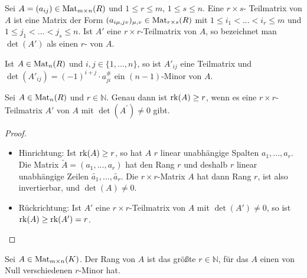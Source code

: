 \begin{definition}[Minor]
	Sei $A=(a_{ij})\in \operatorname{Mat}_{m\times n}(R)$ und $1\le r \le m$, $1\le s \le n$. Eine $r\times s$-
	Teilmatrix von $A$ ist eine Matrix der Form $(a_{i\mu,jv})_{\mu,v}\in \operatorname{Mat}_{r\times s}(R)$ mit $1\le i_1<...<i_r\le m$ 
	und $1\le j_1<...<j_s\le n$. Ist $A'$ eine $r\times r$-Teilmatrix von $A$, so bezeichnet man $\det(A')$ als einen 
	$r$- von $A$.
\end{definition}

\begin{example}
	Ist $A\in \operatorname{Mat}_n(R)$ und $i,j\in \{1,...,n\}$, so ist $A'_{ij}$ eine Teilmatrix und $\det(A'_{ij})=(-1)^{i+j}
	\cdot a^\#_{ji}$ ein $(n-1)$-Minor von $A$.
\end{example}

\begin{proposition}
	Sei $A\in \operatorname{Mat}_n(R)$ und $r\in \mathbb N$. Genau dann ist $\operatorname{rk}(A)\ge r$, wenn es eine $r\times r$-
	Teilmatrix $A'$ von $A$ mit $\det(A^{\prime})\neq 0$ gibt.
\end{proposition}
\begin{proof}
	\begin{itemize}
		\item Hinrichtung: Ist $\operatorname{rk}(A)\ge r$, so hat $A$ $r$ linear unabhängige Spalten $a_1,...,a_r$. Die Matrix $\tilde A=(a_1,...,a_r)$ 
		hat den Rang $r$ und deshalb $r$ linear unabhängige Zeilen $\widetilde{a_1},...,\widetilde{a_r}$. Die $r\times r$-Matrix $A$ hat 
		dann Rang $r$, ist also invertierbar, und $\det(A)\neq 0$.
		\item Rückrichtung: Ist $A'$ eine $r\times r$-Teilmatrix von $A$ mit $\det(A')\neq 0$, so ist $\operatorname{rk}(A)\ge \operatorname{rk}(A')=r$.
	\end{itemize}
\end{proof}

\begin{conclusion}
	Sei $A\in \operatorname{Mat}_{m\times n}(K)$. Der Rang von $A$ ist das größte $r\in \mathbb N$, für das 
	$A$ einen von Null verschiedenen $r$-Minor hat.
\end{conclusion}